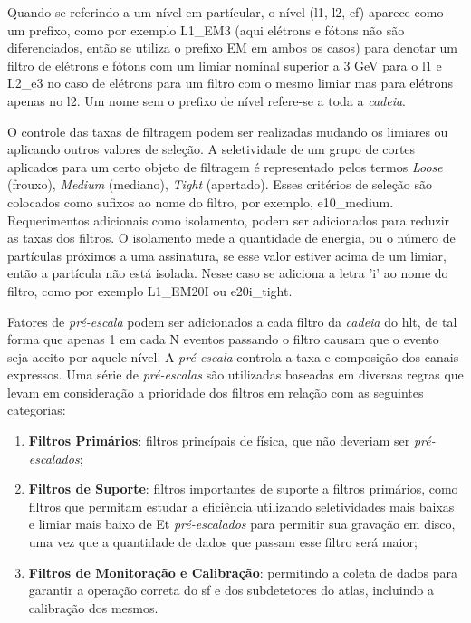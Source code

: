 Quando se referindo a um nível em partícular, o nível (\gls{l1}, \gls{l2},
\gls{ef}) aparece como um prefixo, como por exemplo L1\_EM3 (aqui elétrons e
fótons não são diferenciados, então se utiliza o prefixo EM em ambos os casos)
para denotar um filtro de elétrons e fótons com um limiar nominal superior a 3
GeV para o \gls{l1} e L2\_e3 no caso de elétrons para um filtro com o mesmo
limiar mas para elétrons apenas no \gls{l2}. Um nome sem o prefixo de nível
refere-se a toda a \emph{cadeia}.

O controle das taxas de filtragem podem ser realizadas mudando os limiares ou
aplicando outros valores de seleção. A seletividade de um grupo de cortes
aplicados para um certo objeto de filtragem é representado pelos termos
\emph{Loose} (frouxo), \emph{Medium} (mediano), \emph{Tight} (apertado). Esses
critérios de seleção são colocados como sufixos ao nome do filtro, por exemplo,
e10\_medium. Requerimentos adicionais como isolamento, podem ser adicionados
para reduzir as taxas dos filtros. O isolamento mede a quantidade de energia, ou
o número de partículas próximos a uma assinatura, se esse valor estiver acima de
um limiar, então a partícula não está isolada. Nesse caso se adiciona a letra
'i' ao nome do filtro, como por exemplo L1\_EM20I ou e20i\_tight.

Fatores de \emph{pré-escala} podem ser adicionados a cada filtro da 
\emph{cadeia} do \gls{hlt}, de tal forma que apenas 1 em cada N eventos passando
o filtro causam que o evento seja aceito por aquele nível. A \emph{pré-escala}
controla a taxa e composição dos canais expressos. Uma série de
\emph{pré-escalas} são utilizadas baseadas em diversas regras que levam em
consideração a prioridade dos filtros em relação com as seguintes categorias:

\begin{enumerate}
\item \textbf{Filtros Primários}: filtros princípais de física, que não deveriam
ser \emph{pré-escalados};
\item \textbf{Filtros de Suporte}: filtros importantes de suporte a filtros
primários, como filtros que permitam estudar a eficiência utilizando 
seletividades mais baixas e limiar mais baixo de \gls{Et} \emph{pré-escalados}
para permitir sua gravação em disco, uma vez que a quantidade de dados que
passam esse filtro será maior;
\item \textbf{Filtros de Monitoração e Calibração}: permitindo a coleta de dados
para garantir a operação correta do \gls{sf} e dos subdetetores do \gls{atlas},
incluindo a calibração dos mesmos. 
\end{enumerate}

